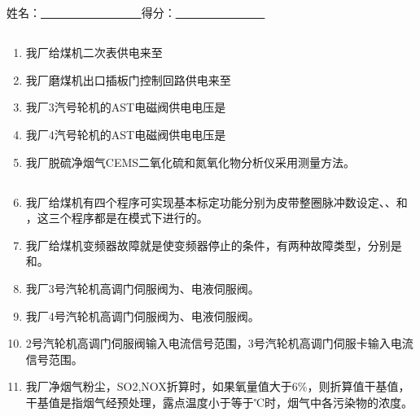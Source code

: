 \documentclass{book}
\begin{document}
		\else						%
		\fi						%
\chapter[2025年07月份技术培训考试]{	\hspace*{-0.3em}}
姓名：\uline{ \ \  \  \ \ \ \ \ \ \ \ \ \ \ \ \ \ }\hfill 得分：\uline{ \ \  \  \ \ \ \ \ \  \ \ \ \ \ \ }
\section{}
\begin{enumerate}
\item 我厂给煤机二次表供电来至
\item 我厂磨煤机出口插板门控制回路供电来至
\item 我厂3汽号轮机的AST电磁阀供电电压是
\item 我厂4汽号轮机的AST电磁阀供电电压是
\item 我厂脱硫净烟气CEMS二氧化硫和氮氧化物分析仪采用测量方法。
\end{enumerate}
\section{}
\begin{enumerate}
	\setcounter{enumi}{5}
\item 我厂给煤机有四个程序可实现基本标定功能分别为皮带整圈脉冲数设定、、和\\ ，这三个程序都是在模式下进行的。
\item 我厂给煤机变频器故障就是使变频器停止的条件，有两种故障类型，分别是和。
	\item 我厂3号汽轮机高调门伺服阀为、电液伺服阀。	
	\item 我厂4号汽轮机高调门伺服阀为、电液伺服阀。
	\item 2号汽轮机高调门伺服阀输入电流信号范围，3号汽轮机高调门伺服卡输入电流信号范围。
\item 我厂净烟气粉尘，SO2,NOX折算时，如果氧量值大于6\%，则折算值干基值，干基值是指烟气经预处理，露点温度小于等于℃时，烟气中各污染物的浓度。
\end{enumerate}
\end{document}
